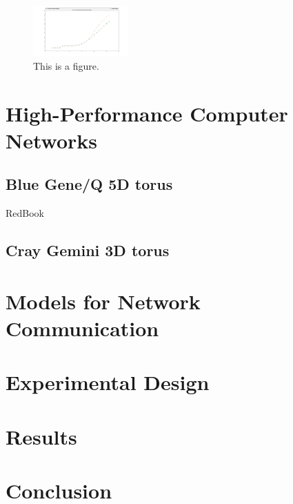 \documentclass[conference,10pt]{IEEEtran}
\begin{document}
\label{sect:Analytic-model}
\begin{figure}
  \center
  \includegraphics[width=0.325\textwidth]{fig/Analytic_regular_no_congestion_170_304_304.png}
  \caption{This is a figure.
    \label{fig:Analytic_regular_no_congestion_170_304_304.png}}
\end{figure}

\section{High-Performance Computer Networks}

\subsection{Blue Gene/Q 5D torus}
RedBook~\cite{BGQ_RedBook_2013}

\subsection{Cray Gemini 3D torus}

\section{Models for Network Communication}

\section{Experimental Design}

\section{Results}

\section{Conclusion}




\end{document}
